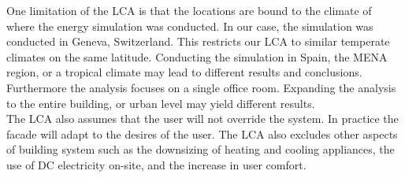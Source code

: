 One limitation of the LCA is that the locations are bound to the climate of where the energy simulation was conducted. In our case, the simulation was conducted in Geneva, Switzerland. This restricts our LCA to similar temperate climates on the same latitude. Conducting the simulation in Spain, the MENA region, or a tropical climate may lead to different results and conclusions. Furthermore the analysis focuses on a single office room. Expanding the analysis to the entire building, or urban level may yield different results.\\
The LCA also assumes that the user will not override the system. In practice the facade will adapt to the desires of the user. 
The LCA also excludes other aspects of building system such as the downsizing of heating and cooling appliances, the use of DC electricity on-site, and the increase in user comfort.



